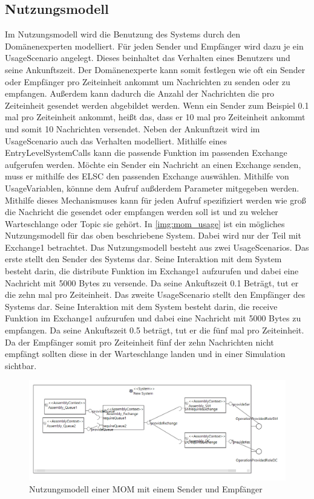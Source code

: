 \subsection{Nutzungsmodell}
Im Nutzungsmodell wird die Benutzung des Systems durch den Domänenexperten modelliert. Für jeden Sender und Empfänger wird dazu je ein UsageScenario angelegt. Dieses beinhaltet das Verhalten eines Benutzers und seine Ankunftszeit. Der Domänenexperte kann somit festlegen wie oft ein Sender oder Empfänger pro Zeiteinheit ankommt um Nachrichten zu senden oder zu empfangen. Außerdem kann dadurch die Anzahl der Nachrichten die pro Zeiteinheit gesendet werden abgebildet werden. Wenn ein Sender zum Beispiel 0.1 mal pro Zeiteinheit ankommt, heißt das, dass er 10 mal pro Zeiteinheit ankommt und somit 10 Nachrichten versendet. Neben der Ankunftzeit wird im UsageScenario auch das Verhalten modelliert. Mithilfe eines EntryLevelSystemCalls kann die passende Funktion im passenden Exchange aufgerufen werden. Möchte ein Sender ein Nachricht an einen Exchange senden, muss er mithilfe des ELSC den passenden Exchange auswählen. Mithilfe von UsageVariablen, könnne dem Aufruf außderdem Parameter mitgegeben werden. Mithilfe dieses Mechanismuses kann für jeden Aufruf spezifiziert werden wie groß die Nachricht die gesendet oder empfangen werden soll ist und zu welcher Warteschlange oder Topic sie gehört. In \autoref{img:mom_usage} ist ein mögliches Nutzungsmodell für das oben beschriebene System. Dabei wird nur der Teil mit Exchange1 betrachtet. Das Nutzungsmodell besteht aus zwei UsageScenarios. Das erste stellt den Sender des Systems dar. Seine Interaktion mit dem System besteht darin, die distribute Funktion im Exchange1 aufzurufen und dabei eine Nachricht mit 5000 Bytes zu versende. Da seine Ankuftszeit 0.1 Beträgt, tut er die zehn mal pro Zeiteinheit. Das zweite UsageScenario stellt den Empfänger des Systems dar. Seine Interaktion mit dem System besteht darin, die receive Funktion im Exchange1 aufzurufen und dabei eine Nachricht mit 5000 Bytes zu empfangen. Da seine Ankuftszeit 0.5 beträgt, tut er die fünf mal pro Zeiteinheit. Da der Empfänger somit pro Zeiteinheit fünf der zehn Nachrichten nicht empfängt sollten diese in der Warteschlange landen und in einer Simulation sichtbar.
\begin{figure}
\center
  \includegraphics[width=1\textwidth]{images/mom_system.png}
  \caption{Nutzungsmodell einer MOM mit einem Sender und Empfänger}
  \label{img:mom_usage}
\end{figure}

